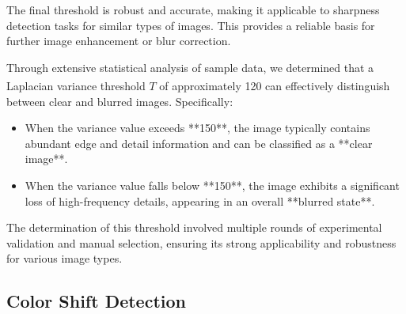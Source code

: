 \documentclass[withoutpreface,bwprint]{cumcmthesis}
\begin{document}
The final threshold is robust and accurate, making it applicable to sharpness detection tasks for similar types of images. This provides a reliable basis for further image enhancement or blur correction.

\begin{table}[htbp]
\centering
{}
\caption{}
\end{table}

Through extensive statistical analysis of sample data, we determined that a Laplacian variance threshold\textsuperscript{\cite{singer2006graph}} $T$ of approximately 120 can effectively distinguish between clear and blurred images. Specifically:

\begin{itemize}[itemindent=2em]
    \item When the variance value exceeds **150**, the image typically contains abundant edge and detail information and can be classified as a **clear image**.

    \item When the variance value falls below **150**, the image exhibits a significant loss of high-frequency details, appearing in an overall **blurred state**.
\end{itemize}

The determination of this threshold involved multiple rounds of experimental validation and manual selection, ensuring its strong applicability and robustness for various image types.

\subsection{Color Shift Detection}
\end{document}
